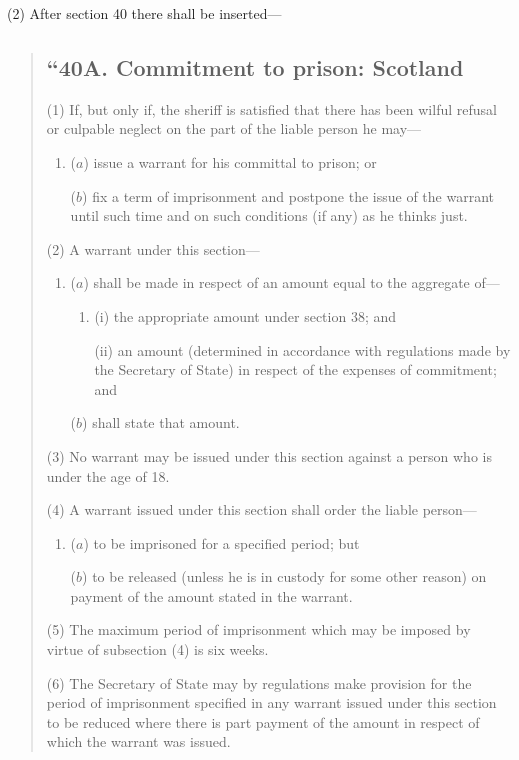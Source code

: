 \documentclass[12pt,a4paper]{article}
\begin{document}
(2) After section 40 there shall be inserted—
\begin{quotation}
\subsection*{“40A. Commitment to prison: Scotland}

(1) If, but only if, the sheriff is satisfied that there has been wilful refusal or culpable neglect on the part of the liable person he may—
\begin{enumerate}\item[]
($a$) issue a warrant for his committal to prison; or

($b$) fix a term of imprisonment and postpone the issue of the warrant until such time and on such conditions (if any) as he thinks just.
\end{enumerate}

(2) A warrant under this section—
\begin{enumerate}\item[]
($a$) shall be made in respect of an amount equal to the aggregate of—
\begin{enumerate}\item[]
(i) the appropriate amount under section 38; and

(ii) an amount (determined in accordance with regulations made by the Secretary of State) in respect of the expenses of commitment; and
\end{enumerate}

($b$) shall state that amount.
\end{enumerate}

(3) No warrant may be issued under this section against a person who is under the age of 18. 

(4) A warrant issued under this section shall order the liable person—
\begin{enumerate}\item[]
($a$) to be imprisoned for a specified period; but

($b$) to be released (unless he is in custody for some other reason) on payment of the amount stated in the warrant.
\end{enumerate}

(5) The maximum period of imprisonment which may be imposed by virtue of subsection (4)  is six weeks.

(6) The Secretary of State may by regulations make provision for the period of imprisonment specified in any warrant issued under this section to be reduced where there is part payment of the amount in respect of which the warrant was issued.


\end{quotation}
\end{document}
